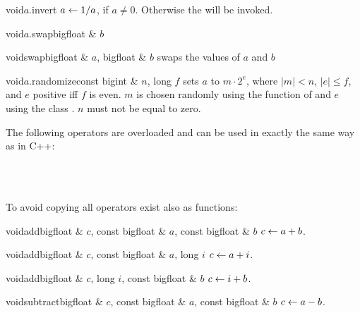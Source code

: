 \begin{fcode}{void}{$a$.invert}{}
  $a \leftarrow 1 / a$, if $a \neq 0$.  Otherwise the \LEH will be invoked.
\end{fcode}

\begin{fcode}{void}{$a$.swap}{bigfloat & $b$}\end{fcode}
\begin{fcode}{void}{swap}{bigfloat & $a$, bigfloat & $b$}
  swaps the values of $a$ and $b$
\end{fcode}

\begin{fcode}{void}{$a$.randomize}{const bigint & $n$, long $f$}
  sets $a$ to $m \cdot 2^e$, where $|m| < n$, $|e| \leq f$, and $e$ positive iff $f$ is
  even.  $m$ is chosen randomly using the  function of 
  and $e$ using the class .  $n$ must not be equal to
  zero.
\end{fcode}



\ARTH

The following operators are overloaded and can be used in exactly the same way as in C++:

\begin{center}
  \\
  \\
\end{center}

To avoid copying all operators exist also as functions:

\begin{fcode}{void}{add}{bigfloat & $c$, const bigfloat & $a$, const bigfloat & $b$}
  $c \leftarrow a + b$.
\end{fcode}

\begin{fcode}{void}{add}{bigfloat & $c$, const bigfloat & $a$, long $i$}
  $c \leftarrow a + i$.
\end{fcode}

\begin{fcode}{void}{add}{bigfloat & $c$, long $i$, const bigfloat & $b$}
  $c \leftarrow i + b$.
\end{fcode}

\begin{fcode}{void}{subtract}{bigfloat & $c$, const bigfloat & $a$, const bigfloat & $b$}
  $c \leftarrow a - b$.
\end{fcode}

